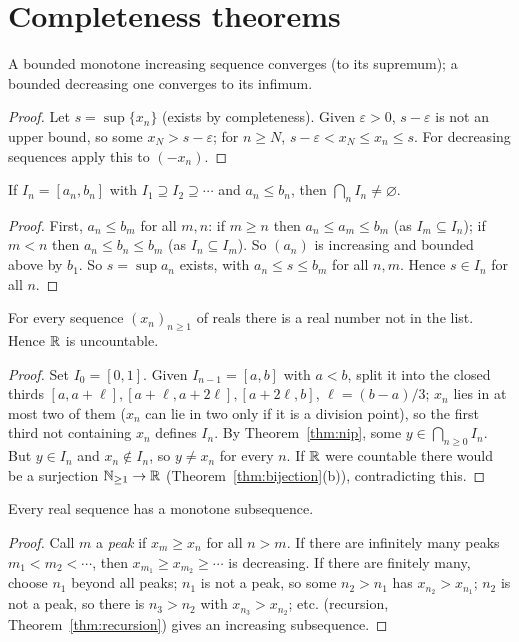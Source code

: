 \section{Completeness theorems}

\begin{theorem}\label{thm:mct}
	A bounded monotone increasing sequence converges (to its supremum); a bounded decreasing one converges to its infimum.
\end{theorem}
\begin{proof}
	Let $s=\sup\{x_n\}$ (exists by completeness). Given $\varepsilon>0$, $s-\varepsilon$ is not an upper bound, so some $x_N>s-\varepsilon$; for $n\ge N$, $s-\varepsilon<x_N\le x_n\le s$. For decreasing sequences apply this to $(-x_n)$.
\end{proof}

\begin{theorem}\label{thm:nip}
	If $I_n=[a_n,b_n]$ with $I_1\supseteq I_2\supseteq\cdots$ and $a_n\le b_n$, then $\bigcap_nI_n\ne\varnothing$.
\end{theorem}
\begin{proof}
	First, $a_n\le b_m$ for all $m,n$: if $m\ge n$ then $a_n\le a_m\le b_m$ (as $I_m\subseteq I_n$); if $m<n$ then $a_n\le b_n\le b_m$ (as $I_n\subseteq I_m$). So $(a_n)$ is increasing and bounded above by $b_1$. So $s=\sup a_n$ exists, with $a_n\le s\le b_m$ for all $n,m$. Hence $s\in I_n$ for all $n$.
\end{proof}

\begin{theorem}[Uncountability of $\R$]\label{thm:Runcountable}
	For every sequence $(x_n)_{n\ge1}$ of reals there is a real number not in the list. Hence $\R$ is uncountable.
\end{theorem}
\begin{proof}
	Set $I_0=[0,1]$. Given $I_{n-1}=[a,b]$ with $a<b$, split it into the closed thirds $[a,a+\ell],[a+\ell,a+2\ell],[a+2\ell,b]$, $\ell=(b-a)/3$; $x_n$ lies in at most two of them ($x_n$ can lie in two only if it is a division point), so the first third not containing $x_n$ defines $I_n$. By Theorem~\ref{thm:nip}, some $y\in\bigcap_{n\ge0}I_n$. But $y\in I_n$ and $x_n\notin I_n$, so $y\neq x_n$ for every $n$. If $\R$ were countable there would be a surjection $\mathbb{N}_{\ge1}\to\mathbb{R}$ (Theorem~\ref{thm:bijection}(b)), contradicting this.
\end{proof}

\begin{lemma}\label{lem:monsub}
	Every real sequence has a monotone subsequence.
\end{lemma}
\begin{proof}
	Call $m$ a \emph{peak} if $x_m\ge x_n$ for all $n>m$. If there are infinitely many peaks $m_1<m_2<\cdots$, then $x_{m_1}\ge x_{m_2}\ge\cdots$ is decreasing. If there are finitely many, choose $n_1$ beyond all peaks; $n_1$ is not a peak, so some $n_2>n_1$ has $x_{n_2}>x_{n_1}$; $n_2$ is not a peak, so there is $n_3>n_2$ with $x_{n_3}>x_{n_2}$; etc. (recursion, Theorem~\ref{thm:recursion}) gives an increasing subsequence.
\end{proof}

